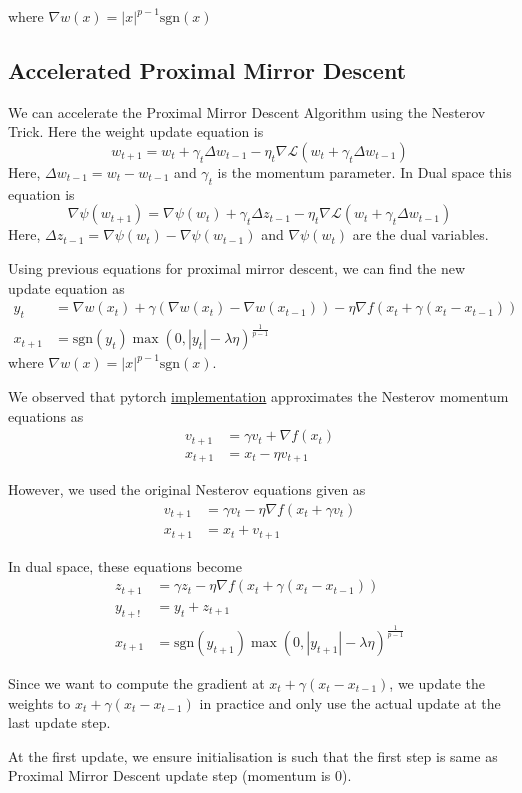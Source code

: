 where $\nabla w(x) = |x|^{p-1} \text{sgn}(x)$

\subsection*{Accelerated Proximal Mirror Descent}

We can accelerate the Proximal Mirror Descent Algorithm using the Nesterov Trick. Here the weight update equation is
\begin{equation}
w_{t+1} = w_t + \gamma_t \Delta w_{t-1} -\eta_t \nabla \mathcal{L}(w_t+\gamma_t\Delta w_{t-1})
\end{equation}
Here, $\Delta w_{t-1} = w_t-w_{t-1}$ and $\gamma_t$ is the momentum parameter. In Dual space this equation is 
\begin{equation}
\nabla \psi(w_{t+1}) = \nabla \psi(w_t) + \gamma_t\Delta z_{t-1} - \eta_t \nabla\mathcal{L}(w_t+\gamma_t \Delta w_{t-1})
\end{equation} 
Here, $\Delta z_{t-1} = \nabla \psi(w_t)-\nabla \psi(w_{t-1})$ and $\nabla \psi(w_t)$ are the dual variables.

Using previous equations for proximal mirror descent, we can find the new update equation as 
\begin{align*}
y_t &= \nabla w(x_t) + \gamma (\nabla w(x_t)-\nabla w(x_{t-1})) - \eta \nabla f(x_t+\gamma (x_t-x_{t-1}))\\
x_{t+1} &= \text{sgn}(y_t) \max(0, |y_t| - \lambda \eta)^{\frac{1}{p-1}}
\end{align*}
where $\nabla w(x) = |x|^{p-1} \text{sgn}(x)$.

We observed that pytorch \href{https://pytorch.org/docs/stable/generated/torch.optim.SGD.html}{implementation} approximates the Nesterov momentum equations as 
\begin{align*}
v_{t+1} &= \gamma v_t + \nabla f(x_t)\\
x_{t+1} &= x_t - \eta v_{t+1}
\end{align*}

However, we used the original Nesterov equations given as
\begin{align*}
v_{t+1} &= \gamma v_t - \eta \nabla f(x_t+\gamma v_t)\\
x_{t+1} &= x_t + v_{t+1}
\end{align*}

In dual space, these equations become
\begin{align*}
z_{t+1} &= \gamma z_t - \eta \nabla f(x_t+\gamma (x_t-x_{t-1}))\\
y_{t+!} &= y_t + z_{t+1}\\
x_{t+1} &= \text{sgn}(y_{t+1}) \max(0, |y_{t+1}| - \lambda \eta)^{\frac{1}{p-1}}
\end{align*}

Since we want to compute the gradient at $x_t+\gamma (x_t-x_{t-1})$, we update the weights to $x_t+\gamma (x_t-x_{t-1})$ in practice and only use the actual update at the last update step. 

At the first update, we ensure initialisation is such that the first step is same as Proximal Mirror Descent update step (momentum is 0).
